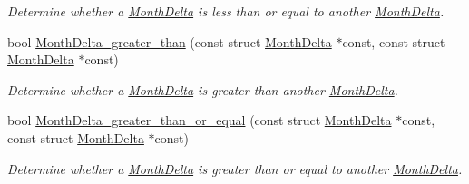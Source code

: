 \begin{DoxyCompactItemize}
\begin{DoxyCompactList}\small\item\em \-Determine whether a \hyperlink{structMonthDelta}{\-Month\-Delta} is less than or equal to another \hyperlink{structMonthDelta}{\-Month\-Delta}. \end{DoxyCompactList}\item 
bool \hyperlink{month-delta_8h_a87f541ed67c5071e5bf359f08a0c4413}{\-Month\-Delta\-\_\-greater\-\_\-than} (const struct \hyperlink{structMonthDelta}{\-Month\-Delta} $\ast$const, const struct \hyperlink{structMonthDelta}{\-Month\-Delta} $\ast$const)
\begin{DoxyCompactList}\small\item\em \-Determine whether a \hyperlink{structMonthDelta}{\-Month\-Delta} is greater than another \hyperlink{structMonthDelta}{\-Month\-Delta}. \end{DoxyCompactList}\item 
bool \hyperlink{month-delta_8h_ac025396048e81af1dc75bc21b7a7c3a8}{\-Month\-Delta\-\_\-greater\-\_\-than\-\_\-or\-\_\-equal} (const struct \hyperlink{structMonthDelta}{\-Month\-Delta} $\ast$const, const struct \hyperlink{structMonthDelta}{\-Month\-Delta} $\ast$const)
\begin{DoxyCompactList}\small\item\em \-Determine whether a \hyperlink{structMonthDelta}{\-Month\-Delta} is greater than or equal to another \hyperlink{structMonthDelta}{\-Month\-Delta}. \end{DoxyCompactList}\end{DoxyCompactItemize}


